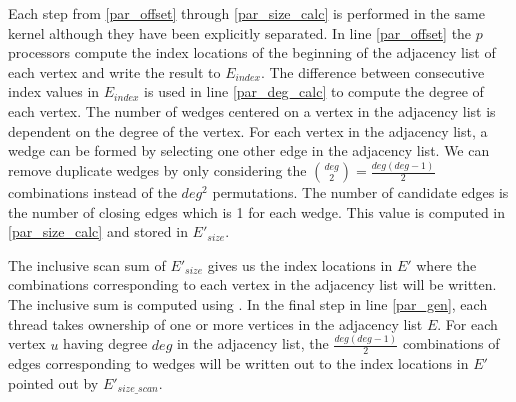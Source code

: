\documentclass[conference]{IEEEtran}
\begin{document}
Each step from \ref{par_offset} through \ref{par_size_calc} is performed in the same kernel although they have been explicitly separated. In line \ref{par_offset} the $p$ processors compute the index locations of the beginning of the adjacency list of each vertex and write the result to $E_{index}$. The difference between consecutive index values in $E_{index}$ is used in line \ref{par_deg_calc} to compute the degree of each vertex. The number of wedges centered on a vertex in the adjacency list is dependent on the degree of the vertex. For each vertex in the adjacency list, a wedge can be formed by selecting one other edge in the adjacency list. We can remove duplicate wedges by only considering the ${deg \choose 2}=\frac{deg(deg-1)}{2}$ combinations instead of the $deg^2$ permutations. The number of candidate edges is the number of closing edges which is 1 for each wedge. This value is computed in \ref{par_size_calc} and stored in $E'_{size}$.

The inclusive scan sum of $E'_{size}$ gives us the index locations in $E'$ where the combinations corresponding to each vertex in the adjacency list will be written. The inclusive sum is computed using \cite{b19}. In the final step in line \ref{par_gen}, each thread takes ownership of one or more vertices in the adjacency list $E$. For each vertex $u$ having degree $deg$ in the adjacency list, the $\frac{deg(deg-1)}{2}$ combinations of edges corresponding to wedges will be written out to the index locations in $E'$ pointed out by $E'_{size\_scan}$.




\end{document}
